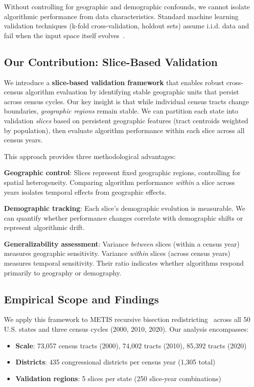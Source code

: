 Without controlling for geographic and demographic confounds, we cannot isolate algorithmic performance from data characteristics. Standard machine learning validation techniques (k-fold cross-validation, holdout sets) assume i.i.d. data and fail when the input space itself evolves~\cite{dietterich1998}.

\subsection{Our Contribution: Slice-Based Validation}

We introduce a \textbf{slice-based validation framework} that enables robust cross-census algorithm evaluation by identifying stable geographic units that persist across census cycles. Our key insight is that while individual census tracts change boundaries, \textit{geographic regions} remain stable. We can partition each state into validation \textit{slices} based on persistent geographic features (tract centroids weighted by population), then evaluate algorithm performance within each slice across all census years.

This approach provides three methodological advantages:

\textbf{Geographic control}: Slices represent fixed geographic regions, controlling for spatial heterogeneity. Comparing algorithm performance \textit{within} a slice across years isolates temporal effects from geographic effects.

\textbf{Demographic tracking}: Each slice's demographic evolution is measurable. We can quantify whether performance changes correlate with demographic shifts or represent algorithmic drift.

\textbf{Generalizability assessment}: Variance \textit{between} slices (within a census year) measures geographic sensitivity. Variance \textit{within} slices (across census years) measures temporal sensitivity. Their ratio indicates whether algorithms respond primarily to geography or demography.

\subsection{Empirical Scope and Findings}

We apply this framework to METIS recursive bisection redistricting~\cite{karypis1998} across all 50 U.S. states and three census cycles (2000, 2010, 2020). Our analysis encompasses:
\begin{itemize}
    \item \textbf{Scale}: 73,057 census tracts (2000), 74,002 tracts (2010), 85,392 tracts (2020)
    \item \textbf{Districts}: 435 congressional districts per census year (1,305 total)
    \item \textbf{Validation regions}: 5 slices per state (250 slice-year combinations)
\end{itemize}

